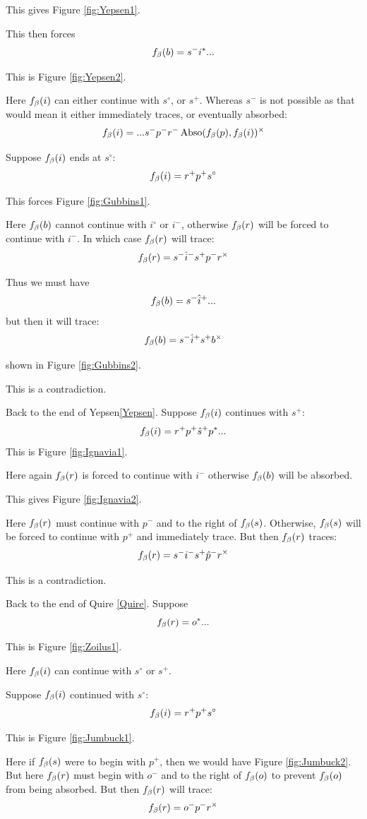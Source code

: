 This gives Figure \ref{fig:Yepsen1}.

This then forces 
$$f_\beta(b) = s^- i^*...$$

This is Figure \ref{fig:Yepsen2}.

Here $f_\beta(i)$ can either continue with $s^\circ$, or $s^+$. Whereas $s^-$ is not possible as that would mean it either immediately traces, or eventually absorbed:
$$f_\beta(i) = ...s^- p^- r^- \operatorname{Abso}(f_\beta(p), f_\beta(i))^\times$$

Suppose $f_\beta(i)$ ends at $s^\circ$:
$$f_\beta(i) = r^+ p^+ s^\circ$$

This forces Figure \ref{fig:Gubbins1}.

Here $f_\beta(b)$ cannot continue with $i^\circ$ or $i^-$, otherwise $f_\beta(r)$ will be forced to continue with $i^-$. In which case $f_\beta(r)$ will trace:
$$f_\beta(r) = s^- \hat{i}^- s^+ p^- r^\times$$

Thus we must have
$$f_\beta(b) = s^- \hat{i}^+...$$
but then it will trace:
$$f_\beta(b) = s^- \hat{i}^+ s^+ b^\times$$

shown in Figure \ref{fig:Gubbins2}.

This is a contradiction.

Back to the end of Yepsen\ref{Yepsen}. Suppose $f_\beta(i)$ continues with $s^+$:
$$f_\beta(i) = r^+ p^+ \hat{s}^+ p^*...$$
This is Figure \ref{fig:Ignavia1}.

Here again $f_\beta(r)$ is forced to continue with $i^-$ otherwise $f_\beta(b)$ will be absorbed. 

This gives Figure \ref{fig:Ignavia2}.

Here $f_\beta(r)$ must continue with $p^-$ and to the right of $f_\beta(s)$. Otherwise, $f_\beta(s)$ will be forced to continue with $p^+$ and immediately trace. But then $f_\beta(r)$ traces:
$$f_\beta(r) = s^- i^- s^+ \hat{p}^- r^\times$$

This is a contradiction.

\label{Zoilus}
Back to the end of Quire \ref{Quire}. Suppose
$$f_\beta(r) = o^*...$$

This is Figure \ref{fig:Zoilus1}.

Here $f_\beta(i)$ can continue with $s^\circ$ or $s^+$.

\label{Jumbuck}
Suppose $f_\beta(i)$ continued with $s^\circ$:
$$f_\beta(i) = r^+ p^+ s^\circ$$

This is Figure \ref{fig:Jumbuck1}.

Here if $f_\beta(s)$ were to begin with $p^+$, then we would have Figure \ref{fig:Jumbuck2}. But here $f_\beta(r)$ must begin with $o^-$ and to the right of $f_\beta(o)$ to prevent $f_\beta(o)$ from being absorbed. But then $f_\beta(r)$ will trace:
$$f_\beta(r) = o^- p^- r^\times$$

